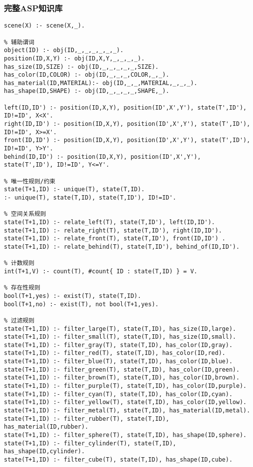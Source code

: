 \subsubsection{完整ASP知识库}
\begin{lstlisting}
scene(X) :- scene(X,_).

% 辅助谓词
object(ID) :- obj(ID,_,_,_,_,_,_).
position(ID,X,Y) :- obj(ID,X,Y,_,_,_,_).
has_size(ID,SIZE) :- obj(ID,_,_,_,_,_,SIZE).
has_color(ID,COLOR) :- obj(ID,_,_,_,COLOR,_,_).
has_material(ID,MATERIAL):- obj(ID,_,_,MATERIAL,_,_,_).
has_shape(ID,SHAPE) :- obj(ID,_,_,_,_,SHAPE,_).

left(ID,ID') :- position(ID,X,Y), position(ID',X',Y'), state(T',ID'), ID!=ID', X<X'.
right(ID,ID') :- position(ID,X,Y), position(ID',X',Y'), state(T',ID'), ID!=ID', X>=X'.
front(ID,ID') :- position(ID,X,Y), position(ID',X',Y'), state(T',ID'), ID!=ID', Y>Y'.
behind(ID,ID') :- position(ID,X,Y), position(ID',X',Y'), state(T',ID'), ID!=ID', Y<=Y'.

% 唯一性规则/约束
state(T+1,ID) :- unique(T), state(T,ID).
:- unique(T), state(T,ID), state(T,ID'), ID!=ID'.

% 空间关系规则
state(T+1,ID) :- relate_left(T), state(T,ID'), left(ID,ID').
state(T+1,ID) :- relate_right(T), state(T,ID'), right(ID,ID').
state(T+1,ID) :- relate_front(T), state(T,ID'), front(ID,ID') .
state(T+1,ID) :- relate_behind(T), state(T,ID'), behind_of(ID,ID').

% 计数规则
int(T+1,V) :- count(T), #count{ ID : state(T,ID) } = V.

% 存在性规则
bool(T+1,yes) :- exist(T), state(T,ID).
bool(T+1,no) :- exist(T), not bool(T+1,yes).

% 过滤规则
state(T+1,ID) :- filter_large(T), state(T,ID), has_size(ID,large).
state(T+1,ID) :- filter_small(T), state(T,ID), has_size(ID,small).
state(T+1,ID) :- filter_gray(T), state(T,ID), has_color(ID,gray).
state(T+1,ID) :- filter_red(T), state(T,ID), has_color(ID,red).
state(T+1,ID) :- filter_blue(T), state(T,ID), has_color(ID,blue).
state(T+1,ID) :- filter_green(T), state(T,ID), has_color(ID,green).
state(T+1,ID) :- filter_brown(T), state(T,ID), has_color(ID,brown).
state(T+1,ID) :- filter_purple(T), state(T,ID), has_color(ID,purple).
state(T+1,ID) :- filter_cyan(T), state(T,ID), has_color(ID,cyan).
state(T+1,ID) :- filter_yellow(T), state(T,ID), has_color(ID,yellow).
state(T+1,ID) :- filter_metal(T), state(T,ID), has_material(ID,metal).
state(T+1,ID) :- filter_rubber(T), state(T,ID), has_material(ID,rubber).
state(T+1,ID) :- filter_sphere(T), state(T,ID), has_shape(ID,sphere).
state(T+1,ID) :- filter_cylinder(T), state(T,ID), has_shape(ID,cylinder).
state(T+1,ID) :- filter_cube(T), state(T,ID), has_shape(ID,cube).


\end{lstlisting}
